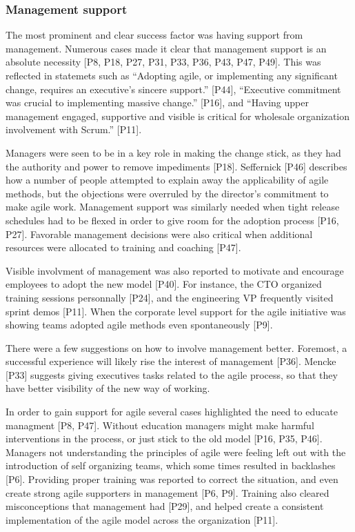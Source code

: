 \documentclass[preprint,authoryear,12pt]{elsarticle}
\begin{document}
\subsubsection{Management support}


The most prominent and clear success factor was having support from management.
Numerous cases made it clear that management support is an absolute necessity
[P8, P18, P27, P31, P33, P36, P43, P47, P49].
This was reflected in statemets such as ``Adopting agile, or implementing any
significant change, requires an executive’s sincere support.'' [P44],
``Executive commitment was crucial to implementing massive change.'' [P16], and
``Having upper management engaged, supportive and visible is critical for
wholesale organization involvement with Scrum.'' [P11].

Managers were seen to be in a key role in making the change stick, as they had
the authority and power to remove impediments [P18]. Seffernick [P46] describes
how a number of people attempted to explain away the applicability of agile
methods, but the objections were overruled by the director's commitment to make
agile work. Management support was similarly needed when tight release schedules
had to be flexed in order to give room for the adoption process [P16, P27].
Favorable management decisions were also critical when additional resources were
allocated to training and coaching [P47].

Visible involvment of management was also reported to motivate and encourage
employees to adopt the new model [P40]. For instance, the CTO organized training
sessions personnally [P24], and the engineering VP frequently visited sprint
demos [P11]. When the corporate level support for the agile initiative was
showing teams adopted agile methods even spontaneously [P9].

There were a few suggestions on how to involve management better. Foremost, a
successful experience will likely rise the interest of management [P36].
Mencke [P33] suggests giving executives tasks related to the agile process,
so that they have better visibility of the new way of working. 


In order to gain support for agile several cases highlighted the need to educate
managment [P8, P47].
Without education managers might make harmful interventions in the process, or
just stick to the old model [P16, P35, P46].
Managers not understanding the principles of agile were feeling left out with
the introduction of self organizing teams, which some times resulted in
backlashes [P6]. Providing proper training was reported to correct the
situation, and even create strong agile supporters in management [P6, P9].
Training also cleared misconceptions that management had [P29], and helped
create a consistent implementation of the agile model across the organization
[P11].
\end{document}
